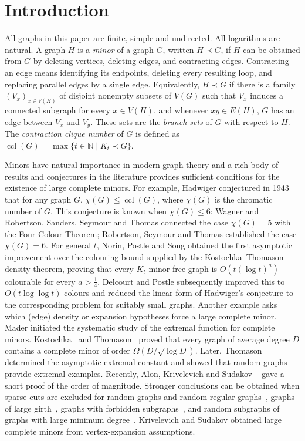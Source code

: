 \documentclass[11pt,a4paper]{article}
\theoremstyle{definition}
\theoremstyle{remark}
\DeclareMathOperator{\ccl}{ccl}
\newcommand{\N}{\mathbb N}
\begin{document}
\section{Introduction}

All graphs in this paper are finite, simple and undirected. All
logarithms are natural. 
A graph $H$ is a \emph{minor} of a graph $G$, written
$H\prec G$, if $H$ can be obtained from $G$ by deleting
vertices, deleting edges, and contracting edges. Contracting an edge
means identifying its endpoints, deleting every resulting loop, and
replacing parallel edges by a single edge. Equivalently,
$H\prec G$ if there is a family
$(V_x)_{x\in V(H)}$ of disjoint nonempty subsets of $V(G)$
such that $V_x$ induces a  connected subgraph for every $x\in V(H)$,  and whenever
$xy\in E(H)$, $G$ has an edge between $V_x$ and  $V_y$. These sets are the \emph{branch sets} of $G$ with respect to $H$.
The \emph{contraction clique number} 
of $G$ is defined as 
$\ccl(G)=\max\{t\in\N\mid K_t\prec G\}$.

Minors have natural importance in modern graph theory and a rich body of results and conjectures in the literature provides sufficient conditions for the existence of large complete minors.  
For example, Hadwiger \cite{Hadwiger} conjectured in 1943   that for any graph $G$, $\chi(G)\le \ccl(G)$, where $\chi(G)$ is the chromatic number of $G$. This conjecture is known when $\chi(G)\le6$: Wagner \cite{Wagner} and  Robertson, Sanders, Seymour and Thomas\cite{RSST}  connected the case $\chi(G)=5$ with the Four Colour Theorem; 
Robertson, Seymour and Thomas \cite{RST} established the case $\chi(G)=6$. For general $t$, Norin, Postle and Song \cite{NPS} obtained the first asymptotic improvement over the colouring bound supplied by the Kostochka--Thomason density theorem, proving that every $K_t$-minor-free graph is $O(t(\log t)^a)$-colourable for every $a>\frac14$. Delcourt and Postle \cite{DP} subsequently improved this to $O(t\log\log t)$ colours and reduced the linear form of Hadwiger's conjecture to the corresponding problem for suitably small graphs. 
%
Another example
asks which (edge) density or expansion hypotheses force a large complete minor. Mader \cite{Mader} initiated the systematic study of the extremal function for complete minors. Kostochka~\cite{Kostochka} and Thomason~\cite{Thomason1984} proved that every graph of average degree $D$ contains a complete minor of order $\Omega(D/\sqrt{\log D})$. Later, Thomason ~\cite{Thomason2001}  determined the asymptotic extremal constant and showed that random graphs provide extremal examples. Recently, Alon, Krivelevich and Sudakov ~\cite{AKS}  gave a short proof of the order of magnitude. Stronger conclusions can be obtained when sparse cuts are excluded for random graphs and random regular graphs~\cite{BCE,FKO08,FKO09}, graphs of large girth~\cite{KuOs,DR}, graphs with forbidden subgraphs~\cite{BFS}, and random subgraphs of graphs with large minimum degree~\cite{EKK}. Krivelevich and Sudakov \cite{KS} obtained large complete minors from vertex-expansion assumptions.  
\end{document}
